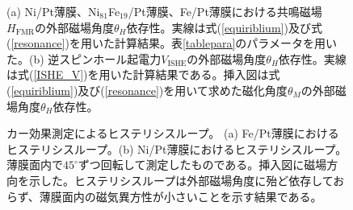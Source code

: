 \begin{figure}[t]
\centerline{
}
\caption{(a) Ni/Pt薄膜、Ni$_{81}$Fe$_{19}$/Pt薄膜、Fe/Pt薄膜における共鳴磁場$H_\text{FMR}$の外部磁場角度$\theta_H$依存性。実線は式(\ref{equiriblium})及び式(\ref{resonance})を用いた計算結果。表\ref{tablepara}のパラメータを用いた。(b) 逆スピンホール起電力$V_\text{ISHE}$の外部磁場角度$\theta_H$依存性。実線は式(\ref{ISHE_V})を用いた計算結果である。挿入図は式(\ref{equiriblium})及び(\ref{resonance})を用いて求めた磁化角度$\theta_M$の外部磁場角度$\theta_H$依存性。}
\label{ISHEangle} 
\end{figure} 


\begin{figure}[htbp]
\begin{center}
\caption{カー効果測定によるヒステリシスループ。
(a) Fe/Pt薄膜におけるヒステリシスループ。(b) Ni/Pt薄膜におけるヒステリシスループ。薄膜面内で$45^\circ$ずつ回転して測定したものである。挿入図に磁場方向を示した。ヒステリシスループは外部磁場角度に殆ど依存しておらず、薄膜面内の磁気異方性が小さいことを示す結果である。}
\label{Kerr_Fe_Ni}
\end{center}
\end{figure}

















